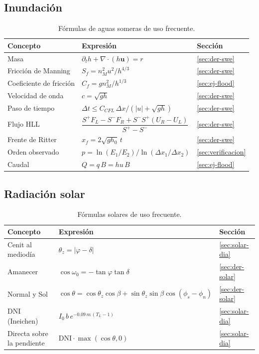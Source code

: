 \documentclass[11pt,a4paper]{article}
\begin{document}
\subsection*{Inundación}
\begin{table}[htbp]
\centering
\caption{Fórmulas de aguas someras de uso frecuente.}
\label{tab:formulas-flood}
\small
\begin{tabularx}{\linewidth}{@{}lXl@{}}
\toprule
Concepto & Expresión & Sección \\
\midrule
Masa & $\partial_th+\nabla\!\cdot(h\mathbf u)=r$ & \ref{sec:der-swe} \\
Fricción de Manning & $S_f=n_M^2u^2/h^{4/3}$ & \ref{sec:der-swe} \\
Coeficiente de fricción & $C_f=gn_M^2/h^{1/3}$ & \ref{sec:ej-flood} \\
Velocidad de onda & $c=\sqrt{gh}$ & \ref{sec:der-swe} \\
Paso de tiempo & $\Delta t\le C_{CFL}\,\Delta x/(|u|+\sqrt{gh})$ & \ref{sec:der-swe} \\
Flujo HLL & $\dfrac{S^+F_L-S^-F_R+S^-S^+(U_R-U_L)}{S^+-S^-}$ & \ref{sec:der-swe} \\
Frente de Ritter & $x_f=2\sqrt{gh_0}\,t$ & \ref{sec:der-swe} \\
Orden observado & $p=\ln(E_1/E_2)/\ln(\Delta x_1/\Delta x_2)$ & \ref{sec:verificacion} \\
Caudal & $Q=q\,B=hu\,B$ & \ref{sec:ej-flood} \\
\bottomrule
\end{tabularx}
\end{table}

\subsection*{Radiación solar}
\begin{table}[htbp]
\centering
\caption{Fórmulas solares de uso frecuente.}
\label{tab:formulas-solar}
\small
\begin{tabularx}{\linewidth}{@{}lXl@{}}
\toprule
Concepto & Expresión & Sección \\
\midrule
Cenit al mediodía & $\theta_z=|\varphi-\delta|$ & \ref{sec:solar-dia} \\
Amanecer & $\cos\omega_0=-\tan\varphi\tan\delta$ & \ref{sec:der-solar} \\
Normal y Sol & $\cos\theta=\cos\theta_z\cos\beta+\sin\theta_z\sin\beta\cos(\phi_s-\phi_n)$ & \ref{sec:der-solar} \\
DNI (Ineichen) & $I_0\,b\,e^{-0.09\,m\,(T_L-1)}$ & \ref{sec:solar-dia} \\
Directa sobre la pendiente & $\mathrm{DNI}\cdot\max(\cos\theta,0)$ & \ref{sec:solar-dia} \\
\bottomrule
\end{tabularx}
\end{table}
\end{document}
